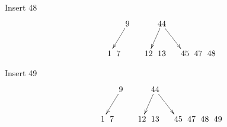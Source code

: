 \documentclass[a4paper]{article}
\begin{document}
Insert 48
$$\xymatrix @C=0pt {
  &   &    &   &    & \ar[dll] 9  & & &  & \ar[dl] 44 \ar[drrr]   &  \\
  &   &   &  1 &  7 &   &  & &  12 &  13 & & & 45 &  47 & 48 \\
}$$

Insert 49
$$\xymatrix @C=0pt {
  &   &    &   &    & \ar[dll] 9  & & &  & \ar[dl] 44 \ar[drrr]   &  \\
  &   &   &  1 &  7 &   &  & &  12 &  13 & & & 45 &  47 & 48 & 49 \\
}$$
\end{document}
